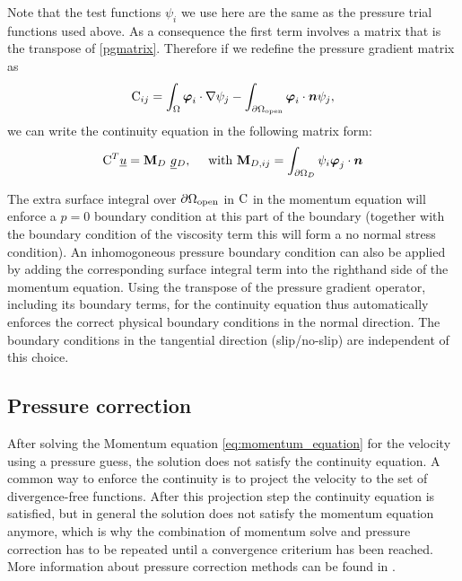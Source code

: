 Note that the test functions $\psi_i$ we use here are the 
same as the pressure trial functions used above. As a consequence
the first term involves a matrix that is the
transpose of \eqref{pgmatrix}. Therefore if we redefine the pressure 
gradient matrix as
\begin{equation*}
  \mathrm{C}_{ij}=\int_\Omega {\mbox{\boldmath$\varphi$}}_i\cdot\nabla\psi_j 
    -\int_{{\partial\Omega}_{\mathrm{open}}} {\mbox{\boldmath$\varphi$}}_i\cdot{\mbox{\boldmath$n$}}\psi_j ,
\end{equation*}
we can write the continuity equation in the following matrix form:
\begin{equation}
  \mathrm{C}^T \underline{u}=
    {\mbox{\boldmath$\mathrm{M}$}}_D ~\underline{g}{}_D, 
    \quad\text{ with }
    {\mbox{\boldmath$\mathrm{M}$}}_{D,ij}=\int_{{\partial\Omega}_D} \psi_i{\mbox{\boldmath$\varphi$}}_j\cdot{\mbox{\boldmath$n$}}
  \label{discrete_incompressible_continuity}
\end{equation}

The extra surface integral over ${\partial\Omega}_{\mathrm{open}}$ in 
$\mathrm{C}$ in the momentum equation will enforce
a $p=0$ boundary condition at this part of the boundary (together with the
boundary condition of the viscosity term this will form a no normal stress 
condition). An inhomogoneous pressure boundary condition can also 
be applied by adding the corresponding
surface integral term into the righthand side of the momentum equation.
Using the transpose of the pressure gradient operator, including its
boundary terms, for the continuity equation thus automatically 
enforces the correct physical boundary conditions in the normal 
direction. 
The boundary 
conditions in the tangential direction (slip/no-slip) are independent of this choice.

\subsection{Pressure correction}\label{Sect:pressure_correction}

After solving the Momentum equation \eqref{eq:momentum_equation} for the 
velocity using a pressure guess, the solution does not satisfy the 
continuity equation. A common way to enforce the continuity is to project 
the velocity to the set of divergence-free functions. After this projection 
step the continuity equation is satisfied, but in general the solution does 
not satisfy the momentum equation anymore, which is why the combination of 
momentum solve and pressure correction has to be repeated until a 
convergence criterium has been reached. 
More information about pressure correction methods can be 
found in \cite{gresho1988}.

